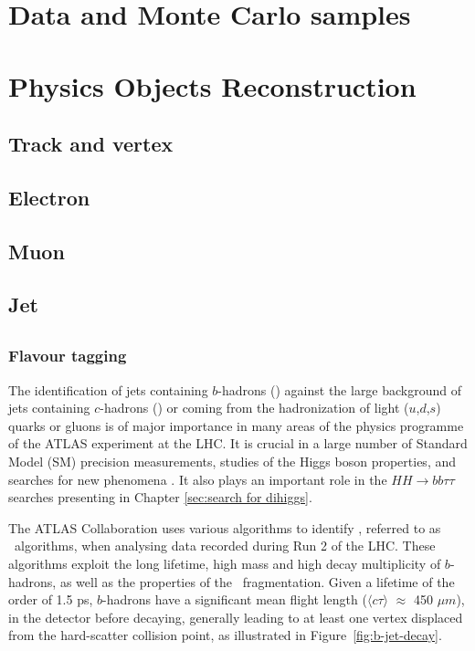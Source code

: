 \documentclass[letterpaper,12pt]{article}
\begin{document}
\section{Data and Monte Carlo samples}
\section{Physics Objects Reconstruction}
\subsection{Track and vertex}
\subsection{Electron}
\subsection{Muon}
\subsection{Jet}
\subsection{\bjets}


\subsubsection{Flavour tagging}
\label{sec:Flavour tagging}

The identification of jets containing $b$-hadrons (\bjets) 
against the large background of jets containing $c$-hadrons 
(\cjets) or coming from the hadronization of light ($u$,$d$,$s$) 
quarks or gluons is of major importance in many areas of the 
physics programme of the ATLAS experiment at the LHC. 
It is crucial in a large number of Standard Model (SM) 
precision measurements, studies of the Higgs boson properties, and 
searches for new phenomena \cite{SUSY-2014-08, ATLAS-CONF-2018-043,Interpreting_Higgs_result}.
It also plays an important role in 
the $HH \to bb\tau\tau$ searches presenting in Chapter \ref{sec:search for dihiggs}. 


The ATLAS Collaboration uses various algorithms to identify 
\bjets \cite{PERF-2012-04}, referred to as \btagging\ algorithms, 
when analysing data recorded during Run 2 of the LHC. These 
algorithms exploit the long lifetime, high mass and high decay 
multiplicity of $b$-hadrons, as well as the properties of the \bquark\  
fragmentation. Given a lifetime of the order of 1.5 ps, $b$-hadrons have a 
significant mean flight length ($\langle c\tau \rangle$ $\approx$ 450 $\mu m$), 
in the detector before decaying, generally leading to at least one vertex 
displaced from the hard-scatter collision point, as illustrated in Figure~\ref{fig:b-jet-decay}.
\end{document}
